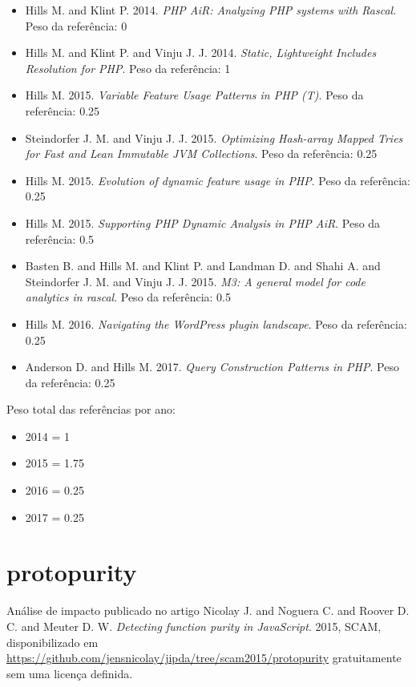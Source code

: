 \begin{itemize}
\item Hills M. and Klint P.
      2014.
      {\it PHP AiR: Analyzing PHP systems with Rascal}.
      Peso da referência: 0
\item Hills M. and Klint P. and Vinju J. J.
      2014.
      {\it Static, Lightweight Includes Resolution for PHP}.
      Peso da referência: 1
\item Hills M.
      2015.
      {\it Variable Feature Usage Patterns in PHP (T)}.
      Peso da referência: 0.25
\item Steindorfer J. M. and Vinju J. J.
      2015.
      {\it Optimizing Hash-array Mapped Tries for Fast and Lean Immutable JVM Collections}.
      Peso da referência: 0.25
\item Hills M.
      2015.
      {\it Evolution of dynamic feature usage in PHP}.
      Peso da referência: 0.25
\item Hills M.
      2015.
      {\it Supporting PHP Dynamic Analysis in PHP AiR}.
      Peso da referência: 0.5
\item Basten B. and Hills M. and Klint P. and Landman D. and Shahi A. and Steindorfer J. M. and Vinju J. J.
      2015.
      {\it M3: A general model for code analytics in rascal}.
      Peso da referência: 0.5
\item Hills M.
      2016.
      {\it Navigating the WordPress plugin landscape}.
      Peso da referência: 0.25
\item Anderson D. and Hills M.
      2017.
      {\it Query Construction Patterns in PHP}.
      Peso da referência: 0.25
\end{itemize}

Peso total das referências por ano:

\begin{itemize}
\item 2014 = 1
\item 2015 = 1.75
\item 2016 = 0.25
\item 2017 = 0.25
\end{itemize}


\section{protopurity}

Análise de impacto
publicado no artigo
Nicolay J. and Noguera C. and Roover D. C. and Meuter D. W.
{\it Detecting function purity in JavaScript}.
2015,
SCAM,
disponibilizado em \url{https://github.com/jensnicolay/jipda/tree/scam2015/protopurity}
gratuitamente
sem uma licença definida.

